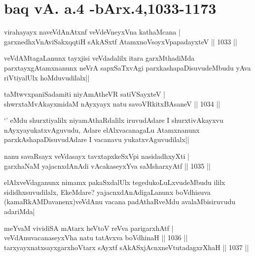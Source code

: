 \section*{baq vA. a.4 -bArx.4,1033-1173}


\begin{shl}
virahayayx naveVdAnAtxnf veVdeVneyxVna kathaMcana |
garxnedhxVnA\s\s viSakxqqtiH sAkASxtf AtamxnoVsoyxVpapadayxteV || 1033 ||
\end{shl}

\begin{artha}
veVdAMtagaLanunx tayxjisi veVdadalilx itara garxMthadiMda parxtayxgAtamxnanunx neVrA 
sapxSaTxvAgi parxkashapaDisuvudeMbudu yAva riVtiyalUlx hoMduvudilalx||
\end{artha}

\begin{shl}
taMtwvxpaniSadamiti niyAmAtheVR satiVSayxteV |\\
shwrxtaMvAkayxmidaM nAyxyayx natu savoVRkitxBAsaneV || 1034 ||
\end{shl}

\begin{artha}
`\stext' eMdu shurxtiyalilx niyamAthaRdalilx iruvudAdare I shurxtivAkayxvu 
nAyxyayukatxvAguvudu, Adare elAlxvacanagaLu Atamxnanunx parxkAshapaDisuvudAdare I vacanavu 
yukatxvAguvudilalx||
\end{artha}

\begin{shl}
nanu savaRsayx veVdasayx tavxtapxkeSxV\s pi nasidadhxyXti |\\
garxhaNaM yajacnxdAnAdi vAcakaseyxYva saMsharxyAtf || 1035 ||
\end{shl}

\begin{artha}
elAlxveVdaganunx nimamx pakaSxdalUlx tegedukoLuLxvudeMbudu ililx sididhxsuvudilalx, 
EkeMdare? yajacnxdAnAdigaLanunx boVdhisuva (kamaRkAMDavanenx)veVdAnu vacana padAthaRveMdu 
avalaMbisiruvudu adariMda|
\end{artha}


\begin{shl}
meYvaM vividiSA mAtarx heVtoV reVva parigarxhAtf |\\
veVdAnuvacanaseyxVha natu tatAvxva boVdhinaH || 1036 ||\\
tarxyayxnatxsayxgarxhoVtarx sAyxtf sAkASxjAcnxneVtutadagxrXhaH || 1037 ||
\end{shl}

